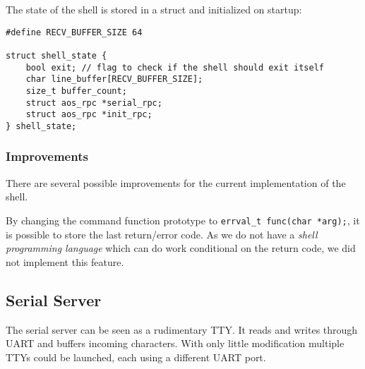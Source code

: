 The state of the shell is stored in a struct and initialized on startup:

\begin{lstlisting}
#define RECV_BUFFER_SIZE 64

struct shell_state {
    bool exit; // flag to check if the shell should exit itself
    char line_buffer[RECV_BUFFER_SIZE];
    size_t buffer_count;
    struct aos_rpc *serial_rpc;
    struct aos_rpc *init_rpc;
} shell_state;
\end{lstlisting}

\subsubsection{Improvements}
There are several possible improvements for the current implementation of the shell.

By changing the command function prototype to \verb|errval_t func(char *arg);|, it is possible to store the last return/error code.
As we do not have a \emph{shell programming language} which can do work conditional on the return code, we did not implement this feature.





\subsection{Serial Server}
The serial server can be seen as a rudimentary TTY. It reads and writes through UART and buffers incoming characters.
With only little modification multiple TTYs could be launched, each using a different UART port.

